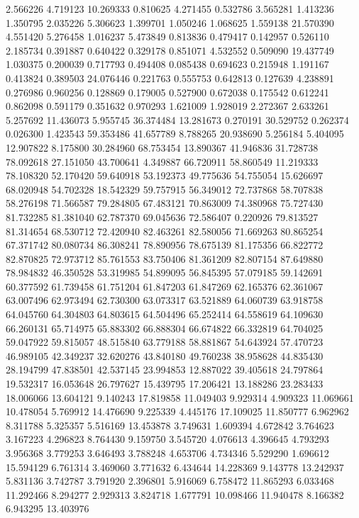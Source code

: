 2.566226
4.719123
10.269333
0.810625
4.271455
0.532786
3.565281
1.413236
1.350795
2.035226
5.306623
1.399701
1.050246
1.068625
1.559138
21.570390
4.551420
5.276458
1.016237
5.473849
0.813836
0.479417
0.142957
0.526110
2.185734
0.391887
0.640422
0.329178
0.851071
4.532552
0.509090
19.437749
1.030375
0.200039
0.717793
0.494408
0.085438
0.694623
0.215948
1.191167
0.413824
0.389503
24.076446
0.221763
0.555753
0.642813
0.127639
4.238891
0.276986
0.960256
0.128869
0.179005
0.527900
0.672038
0.175542
0.612241
0.862098
0.591179
0.351632
0.970293
1.621009
1.928019
2.272367
2.633261
5.257692
11.436073
5.955745
36.374484
13.281673
0.270191
30.529752
0.262374
0.026300
1.423543
59.353486
41.657789
8.788265
20.938690
5.256184
5.404095
12.907822
8.175800
30.284960
68.753454
13.890367
41.946836
31.728738
78.092618
27.151050
43.700641
4.349887
66.720911
58.860549
11.219333
78.108320
52.170420
59.640918
53.192373
49.775636
54.755054
15.626697
68.020948
54.702328
18.542329
59.757915
56.349012
72.737868
58.707838
58.276198
71.566587
79.284805
67.483121
70.863009
74.380968
75.727430
81.732285
81.381040
62.787370
69.045636
72.586407
0.220926
79.813527
81.314654
68.530712
72.420940
82.463261
82.580056
71.669263
80.865254
67.371742
80.080734
86.308241
78.890956
78.675139
81.175356
66.822772
82.870825
72.973712
85.761553
83.750406
81.361209
82.807154
87.649880
78.984832
46.350528
53.319985
54.899095
56.845395
57.079185
59.142691
60.377592
61.739458
61.751204
61.847203
61.847269
62.165376
62.361067
63.007496
62.973494
62.730300
63.073317
63.521889
64.060739
63.918758
64.045760
64.304803
64.803615
64.504496
65.252414
64.558619
64.109630
66.260131
65.714975
65.883302
66.888304
66.674822
66.332819
64.704025
59.047922
59.815057
48.515840
63.779188
58.881867
54.643924
57.470723
46.989105
42.349237
32.620276
43.840180
49.760238
38.958628
44.835430
28.194799
47.838501
42.537145
23.994853
12.887022
39.405618
24.797864
19.532317
16.053648
26.797627
15.439795
17.206421
13.188286
23.283433
18.006066
13.604121
9.140243
17.819858
11.049403
9.929314
4.909323
11.069661
10.478054
5.769912
14.476690
9.225339
4.445176
17.109025
11.850777
6.962962
8.311788
5.325357
5.516169
13.453878
3.749631
1.609394
4.672842
3.764623
3.167223
4.296823
8.764430
9.159750
3.545720
4.076613
4.396645
4.793293
3.956368
3.779253
3.646493
3.788248
4.653706
4.734346
5.529290
1.696612
15.594129
6.761314
3.469060
3.771632
6.434644
14.228369
9.143778
13.242937
5.831136
3.742787
3.791920
2.396801
5.916069
6.758472
11.865293
6.033468
11.292466
8.294277
2.929313
3.824718
1.677791
10.098466
11.940478
8.166382
6.943295
13.403976
